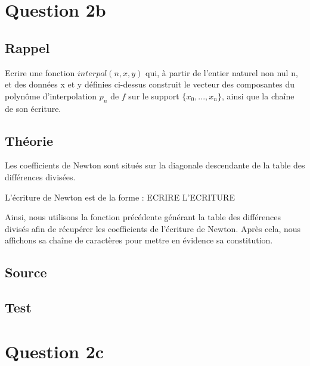 \documentclass[a4paper,10pt]{report}
\begin{document}
\section*{Question 2b}

\subsection*{Rappel}

Ecrire une fonction $interpol(n, x, y)$ qui, à partir de l’entier naturel non
nul n, et des données x et y définies ci-dessus construit le vecteur des
composantes du polynôme d’interpolation $p_{n}$ de $f$ sur le support $\lbrace  x_{0},...,x_{n} \rbrace$,
ainsi que la chaîne de son écriture.

\subsection*{Théorie}

Les coefficients de Newton sont situés sur la diagonale descendante de la table des différences divisées. 

L’écriture de Newton est de la forme : ECRIRE L’ECRITURE

Ainsi, nous utilisons la fonction précédente générant la table des différences divisés afin de récupérer les coefficients de l’écriture de Newton. Après cela, nous affichons sa chaîne de caractères pour mettre en évidence sa constitution. 

\newpage
\subsection*{Source}

\begin{center}
	
\end{center}

\subsection*{Test}

\section*{Question 2c}
\end{document}
